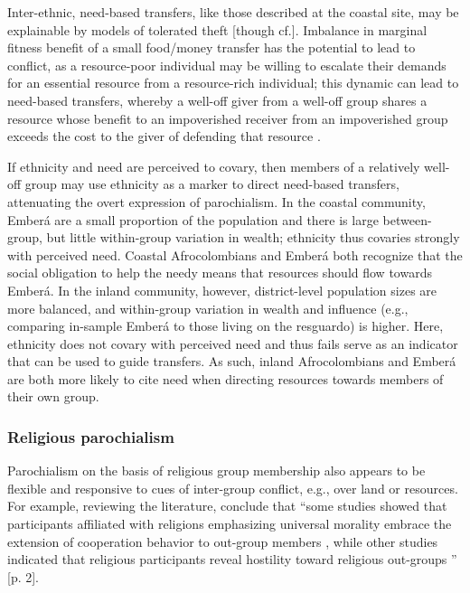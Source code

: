 \documentclass[bibauthoryear]{aa}
\begin{document}
Inter-ethnic, need-based transfers, like those described at the coastal site, may be explainable by models of tolerated theft [though cf.]\citep{hao2015need}. Imbalance in marginal fitness benefit of a small food/money transfer has the potential to lead to conflict, as a resource-poor individual may be willing to escalate their demands for an essential resource from a resource-rich individual; this dynamic can lead to need-based transfers, whereby a well-off giver from a well-off group shares a resource whose benefit to an impoverished receiver from an impoverished group exceeds the cost to the giver of defending that resource \citep{jones1984selfish, winterhalder1996marginal, winterhalder1997gifts}.

 If ethnicity and need are perceived to covary, then members of a relatively well-off group may use ethnicity as a marker to direct need-based transfers, attenuating the overt expression of parochialism. In the coastal community, Ember\'a are a small proportion of the population and there is large between-group, but little within-group variation in wealth; ethnicity thus covaries strongly with perceived need. Coastal Afrocolombians and Ember\'a both recognize that the social obligation to help the needy means that resources should flow towards Ember\'a.  In the inland community, however, district-level population sizes are more balanced, and within-group variation in wealth and influence (e.g., comparing in-sample Ember\'a to those living on the resguardo) is higher. Here, ethnicity does not covary with perceived need and thus fails serve as an indicator that can be used to guide transfers. As such, inland Afrocolombians and Ember\'a are both more likely to cite need when directing resources towards members of their own group. 

\subsubsection{Religious parochialism}\label{relig}

Parochialism on the basis of religious group membership also appears to be flexible and responsive to cues of inter-group conflict, e.g., over land or resources. For example, reviewing the literature, \citet{lang2019moralizing} conclude that ``some studies showed that participants affiliated with religions emphasizing universal morality embrace the extension of cooperation behavior to out-group members \citep{preston2013different, ginges2016thinking, clingingsmith2009estimating, mccullough2016christian}, while other studies indicated that religious participants reveal hostility toward religious out-groups \citep{bushman2007god, shaver2018boundaries}'' [p. 2]. 
\end{document}
